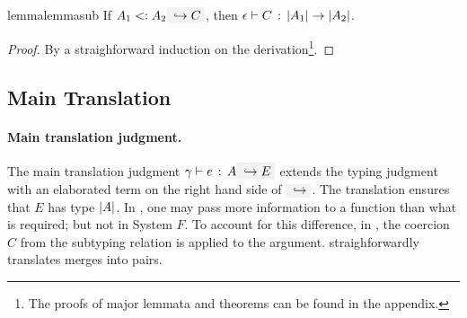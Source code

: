 \begin{restatable}{lemma}{lemmasub}
  \label{lemma:sub}
  If $ A_1 \subtype A_2 \yields C $, then $ \epsilon \vdash C \ \!:\! \ \lvert A_1 \rvert \to \lvert A_2 \rvert $.
\end{restatable}

\begin{proof}
  By a straighforward induction on the derivation\footnote{The proofs of major lemmata and theorems can be found in the appendix.}.
\end{proof}

\subsection{Main Translation}

\begin{comment}
In this subsection we now present formally the translation rules that convert
\name terms into System $ F $ ones. This set of rules essentially extends
those in the previous section with the light-blue part for the translation.
\end{comment}


\paragraph{Main translation judgment.} The main translation judgment
$\hastype \gamma e A \yields E$ extends the typing judgment with an elaborated
term on the right hand side of $\yields {}$. The translation ensures
that $E$ has type $\lvert A \rvert$. In \name, one may pass more information to a
function than what is required; but not in System $F$. To account for this
difference, in , the coercion $C$ from the subtyping relation is
applied to the argument.  straighforwardly translates merges
into pairs.



